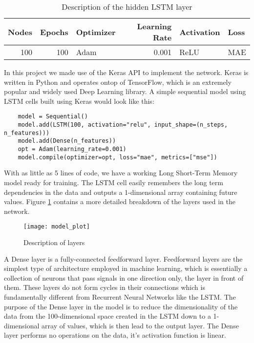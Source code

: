 \begin{table}[h]
    \centering
    \begin{tabular}{|r|r|l|r|l|l|}
        \hline
        \textbf{Nodes} & \textbf{Epochs} & \textbf{Optimizer} & \textbf{Learning Rate} & \textbf{Activation} & \textbf{Loss} \\ \hline
        100            & 100             & Adam               & 0.001                  & ReLU                & MAE           \\ \hline
        \end{tabular}
    \caption{Description of the hidden LSTM layer}
    \label{tab:lstm_layer}
\end{table}

In this project we made use of the Keras API to implement the network. Keras is written in Python and operates ontop of TensorFlow, which is an extremely popular and widely used Deep Learning library. A simple sequential model using LSTM cells built using Keras would look like this:

\begin{verbatim}
    model = Sequential()
    model.add(LSTM(100, activation="relu", input_shape=(n_steps, n_features)))
    model.add(Dense(n_features))
    opt = Adam(learning_rate=0.001)
    model.compile(optimizer=opt, loss="mae", metrics=["mse"])
\end{verbatim}

With as little as 5 lines of code, we have a working Long Short-Term Memory model ready for training. The LSTM cell easily remembers the long term dependencies in the data and outputs a 1-dimensional array containing future values. Figure \ref{tab:layer_description} contains a more detailed breakdown of the layers used in the network.

\begin{figure}[H]
    \centering
    \texttt{[image: model\_plot]}
    \caption{Description of layers}
    \label{tab:layer_description}
\end{figure}

A Dense layer is a fully-connected feedforward layer. Feedforward layers are the simplest type of architecture employed in machine learning, which is essentially a collection of neurons that pass signals in one direction only, the layer in front of them. These layers do not form cycles in their connections which is fundamentally different from Recurrent Neural Networks like the LSTM. The purpose of the Dense layer in the model is to reduce the dimensionality of the data from the 100-dimensional space created in the LSTM down to a 1-dimensional array of values, which is then lead to the output layer. The Dense layer performs no operations on the data, it's activation function is linear.

